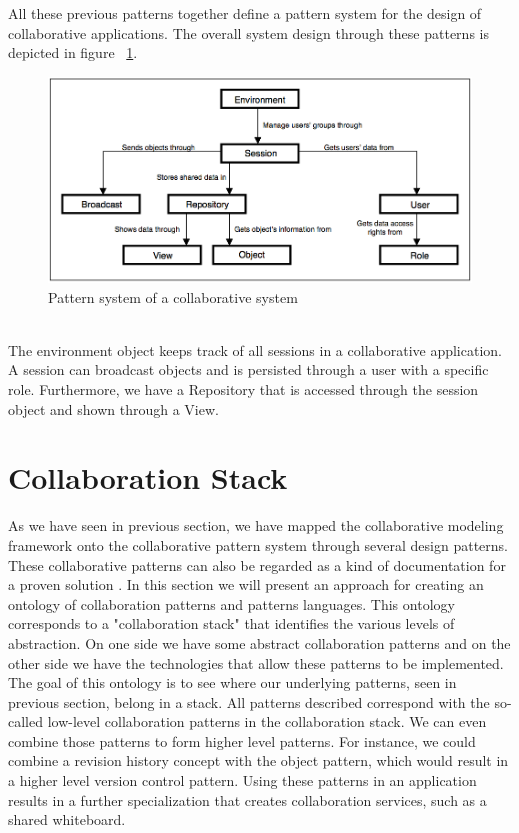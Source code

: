 All these previous patterns together define a pattern system for the design of collaborative applications. The overall system design through these patterns is depicted in figure ~\ref{fig:pattern_system}.
\begin{figure}[h!]
\centering
\includegraphics[width=1.0\textwidth]{images/chap5_pattern_system.png}
\caption{Pattern system of a collaborative system}
\label{fig:pattern_system}
\end{figure} \\
The environment object keeps track of all sessions in a collaborative application. A session can broadcast objects and is persisted through a user with a specific role. Furthermore, we have a Repository that is accessed through the session object and shown through a View.

\section{Collaboration Stack}

As we have seen in previous section, we have mapped the collaborative modeling framework onto the collaborative pattern system through several design patterns. These collaborative patterns can also be regarded as a kind of documentation for a proven solution \cite{CollOntology}. In this section we will present an approach for creating an ontology of collaboration patterns and patterns languages. This ontology corresponds to a "collaboration stack" that identifies the various levels of abstraction. On one side we have some abstract collaboration patterns and on the other side we have the technologies that allow these patterns to be implemented. The goal of this ontology is to see where our underlying patterns, seen in previous section, belong in a stack. All patterns described correspond with the so-called low-level collaboration patterns in the collaboration stack. We can even combine those patterns to form higher level patterns. For instance, we could combine a revision history concept with the object pattern, which would result in a higher level version control pattern. Using these patterns in an application results in a further specialization that creates collaboration services, such as a shared whiteboard.

